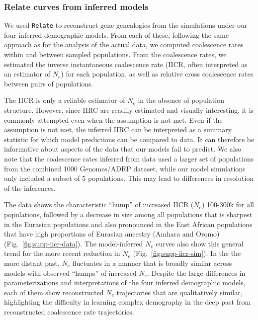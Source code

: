 \documentclass[]{article}
\newcommand{\Relate}{\texttt{Relate}\xspace}
\begin{document}
\subsubsection{Relate curves from inferred models}
\label{inferred_relate}
We used \Relate \citep{Speidel2019-nj} to reconstruct gene genealogies from the
simulations under our four inferred demographic models. From each of these,
following the same approach as for the analysis of the actual data, we computed
coalescence rates within and between sampled populations. From the coalescence
rates, we estimated the inverse instantaneous coalescence rate (IICR, often
interpreted as an estimator of $N_e$) for each population, as well as relative
cross coalescence rates between pairs of populations.

The IICR is only a reliable estimator of $N_e$ in the absence of population structure.
However, since IIRC are readily estimated and visually interesting,
it is commonly attempted even when the assumption is not met.
Even if the assumption is not met, the inferred IIRC can be interpreted as a
summary statistic for which model predictions can be compared to data.
It can therefore be
informative about aspects of the data that our models fail to predict.
We also note that the coalescence rates inferred from data used a larger set of
populations from the combined 1000 Genomes/ADRP dataset, while our model
simulations only included a subset of 5 populations. This may lead to
differences in resolution of the inferences.

The data shows the characteristic ``hump'' of increased IICR ($N_e$) 100-300k
for all populations, followed by a decrease in size among all populations that
is sharpest in the Eurasian populations and also pronounced in the East African
populations that have high proportions of Eurasian ancestry (Amhara and Oromo)
(Fig.~\ref{fig:supp-iicr-data}). The model-inferred $N_e$ curves also show this
general trend for the more recent reduction in $N_e$
(Fig.~\ref{fig:supp-iicr-sim}). In the the more distant past, $N_e$ fluctuates
in a manner that is broadly similar across models with observed ``humps'' of
increased $N_e$. Despite the large differences in parameterizations and
interpretations of the four inferred demographic models, each of them show
reconstructed $N_e$ trajectories that are qualitatively similar, highlighting
the difficulty in learning complex demography in the deep past from
reconstructed coalescence rate trajectories.
\end{document}
